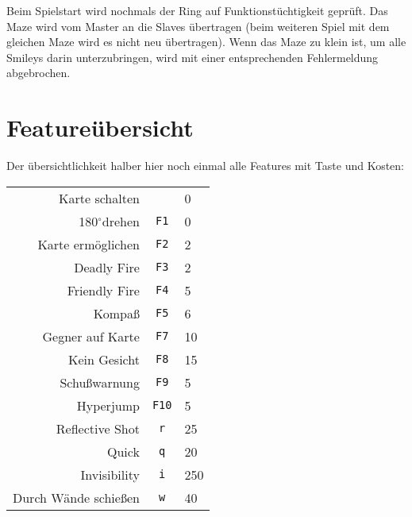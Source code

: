 \documentclass[12pt,twoside]{article}
\newcommand{\grad}{$^\circ$}
\begin{document}
Beim Spielstart wird nochmals der Ring auf Funktionst\"uchtigkeit gepr\"uft. Das 
Maze wird vom Master an die Slaves \"ubertragen (beim weiteren Spiel mit dem 
gleichen Maze wird es nicht neu \"ubertragen). Wenn das Maze zu klein ist, um 
alle Smileys darin unterzubringen, wird mit einer entsprechenden 
Fehlermeldung abgebrochen.


\vfill

\pagebreak


\section{Feature\"ubersicht}


Der \"ubersichtlichkeit halber hier noch einmal alle Features mit Taste und 
Kosten:


\begin{center}

\begin{tabular}{|r|c|l|}

\hline

Karte schalten & & 0\\

180\grad drehen & \verb|F1| & 0\\

Karte erm\"oglichen &\verb|F2| & 2\\

Deadly Fire & \verb|F3| & 2\\

Friendly Fire & \verb|F4| & 5\\

Kompa\ss{} & \verb|F5| & 6\\

Gegner auf Karte & \verb|F7| & 10\\

Kein Gesicht & \verb|F8| & 15\\

Schu\ss{}warnung & \verb|F9| & 5\\

Hyperjump & \verb|F10| & 5\\

Reflective Shot & \verb|r| & 25\\

Quick & \verb|q| & 20\\

Invisibility & \verb|i| & 250\\

Durch W\"ande schie\ss{}en & \verb|w| & 40\\


\end{tabular}
\end{center}
\end{document}
